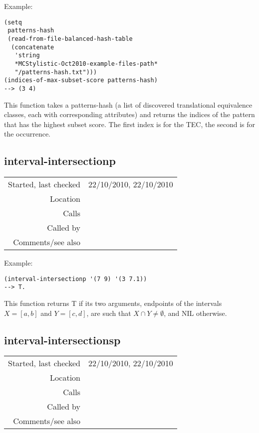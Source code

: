 \vspace{0.5cm}
\noindent Example:
\begin{verbatim}
(setq
 patterns-hash
 (read-from-file-balanced-hash-table
  (concatenate
   'string
   *MCStylistic-Oct2010-example-files-path*
   "/patterns-hash.txt")))
(indices-of-max-subset-score patterns-hash)
--> (3 4)
\end{verbatim}

\noindent This function takes a patterns-hash (a list
of discovered translational equivalence classes, each
with corresponding attributes) and returns the indices
of the pattern that has the highest subset score. The
first index is for the TEC, the second is for the
occurrence.


\subsection*{interval-intersectionp}\label{fun:interval-intersectionp}

\vspace{0.3cm}
\begin{tabular}{r|p{8cm}}
Started, last checked & 22/10/2010, 22/10/2010 \\
Location & \nameref{sec:generating-with-patterns-preliminaries} \\
Calls & \\
Called by & \nameref{fun:interval-intersectionsp} \\
Comments/see also &
\end{tabular}

\vspace{0.5cm}
\noindent Example:
\begin{verbatim}
(interval-intersectionp '(7 9) '(3 7.1))
--> T.
\end{verbatim}

\noindent This function returns T if its two
arguments, endpoints of the intervals $X = [a, b]$
and $Y = [c, d]$, are such that $X \cap Y \neq
\emptyset$, and NIL otherwise.


\subsection*{interval-intersectionsp}\label{fun:interval-intersectionsp}

\vspace{0.3cm}
\begin{tabular}{r|p{8cm}}
Started, last checked & 22/10/2010, 22/10/2010 \\
Location & \nameref{sec:generating-with-patterns-preliminaries} \\
Calls & \nameref{fun:interval-intersectionp} \\
Called by & \nameref{fun:generate-intervals} \\
Comments/see also &
\end{tabular}

